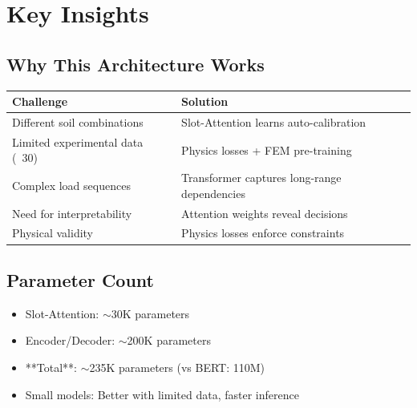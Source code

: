 \documentclass[11pt,a4paper]{article}
\begin{document}
\section{Key Insights}

\subsection{Why This Architecture Works}

\begin{table}[H]
\centering
\begin{tabular}{|l|l|}
\hline
\textbf{Challenge} & \textbf{Solution} \\
\hline
Different soil combinations & Slot-Attention learns auto-calibration \\
\hline
Limited experimental data (~30) & Physics losses + FEM pre-training \\
\hline
Complex load sequences & Transformer captures long-range dependencies \\
\hline
Need for interpretability & Attention weights reveal decisions \\
\hline
Physical validity & Physics losses enforce constraints \\
\hline
\end{tabular}
\end{table}

\subsection{Parameter Count}

\begin{itemize}
  \item Slot-Attention: $\sim$30K parameters
  \item Encoder/Decoder: $\sim$200K parameters
  \item **Total**: $\sim$235K parameters (vs BERT: 110M)
  \item Small models: Better with limited data, faster inference
\end{itemize}
\end{document}

